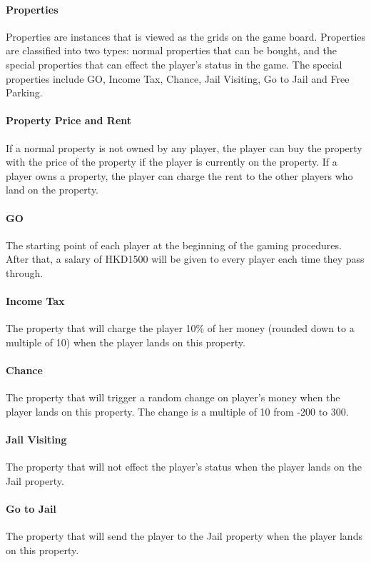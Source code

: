 \documentclass{article}
\begin{document}
\paragraph{Properties} Properties are instances that is viewed as the grids on the game board. Properties are classified into two types: normal properties that can be bought, and the special properties that can effect the player's status in the game.
The special properties include GO, Income Tax, Chance, Jail Visiting, Go to Jail and Free Parking.

\paragraph{Property Price and Rent} If a normal property is not owned by any player, the player can buy the property with the price of the property if the player is currently on the property. If a player owns a property, the player can charge the rent to the other players who land on the property.

\paragraph{GO} The starting point of each player at the beginning of the gaming procedures. After that, a salary of HKD1500 will be given to every player each time they pass through.

\paragraph{Income Tax} The property that will charge the player 10\% of her money (rounded down to a multiple of 10) when the player lands on this property.

\paragraph{Chance} The property that will trigger a random change on player's money when the player lands on this property. 
The change is a multiple of 10 from -200 to 300.

\paragraph{Jail Visiting} The property that will not effect the player's status when the player lands on the Jail property.

\paragraph{Go to Jail} The property that will send the player to the Jail property when the player lands on this property. 
\end{document}
